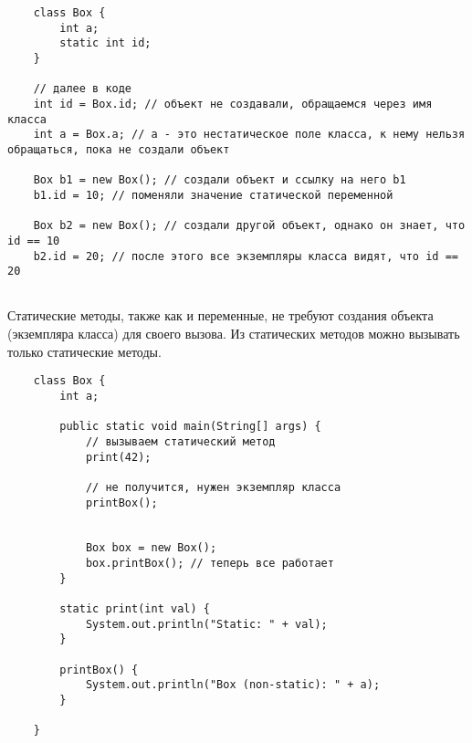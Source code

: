 \begin{lstlisting}
	class Box {
		int a;
		static int id;
	}

	// далее в коде
	int id = Box.id; // объект не создавали, обращаемся через имя класса
	int a = Box.a; // a - это нестатическое поле класса, к нему нельзя обращаться, пока не создали объект

	Box b1 = new Box(); // создали объект и ссылку на него b1
	b1.id = 10; // поменяли значение статической переменной

	Box b2 = new Box(); // создали другой объект, однако он знает, что id == 10
	b2.id = 20; // после этого все экземпляры класса видят, что id == 20


\end{lstlisting}

Статические методы, также как и переменные, не требуют создания объекта (экземпляра класса) для своего вызова. Из статических методов можно вызывать только статические методы.

\begin{lstlisting}
	class Box {
		int a;
		
		public static void main(String[] args) {
			// вызываем статический метод
			print(42);

			// не получится, нужен экземпляр класса
			printBox();


			Box box = new Box();
			box.printBox(); // теперь все работает
		}

		static print(int val) {
			System.out.println("Static: " + val);
		}

		printBox() {
			System.out.println("Box (non-static): " + a);
		}

	}

\end{lstlisting}

















